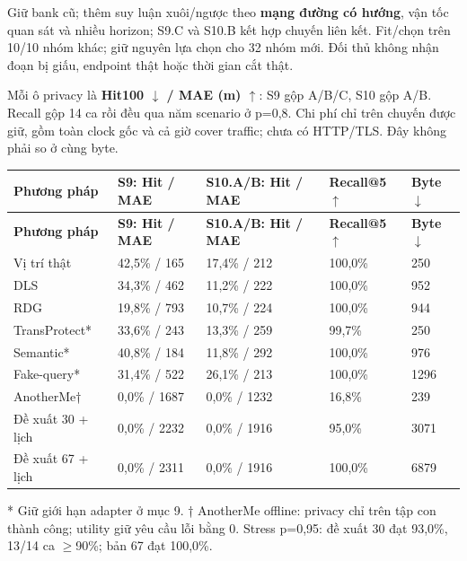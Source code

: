 \documentclass[10pt,a4paper]{article}
\begin{document}
Giữ bank cũ; thêm suy luận xuôi/ngược theo \textbf{mạng đường có hướng}, vận tốc quan sát và nhiều horizon; S9.C và S10.B kết hợp chuyến liên kết. Fit/chọn trên 10/10 nhóm khác; giữ nguyên lựa chọn cho 32 nhóm mới. Đối thủ không nhận đoạn bị giấu, endpoint thật hoặc thời gian cắt thật.

Mỗi ô privacy là \textbf{Hit100 $\downarrow$ / MAE (m) $\uparrow$}: S9 gộp A/B/C, S10 gộp A/B. Recall gộp 14 ca rồi đều qua năm scenario ở p=0,8. Chi phí chỉ trên chuyến được giữ, gồm toàn clock gốc và cả giờ cover traffic; chưa có HTTP/TLS. Đây không phải so ở cùng byte.

\begingroup\small
\begin{longtable}{@{}P{3.900cm}P{3.329cm}P{3.329cm}P{2.663cm}P{2.854cm}@{}}
\toprule
\textbf{Phương pháp} & \textbf{S9: Hit / MAE} & \textbf{S10.A/B: Hit / MAE} & \textbf{Recall@5 $\uparrow$} & \textbf{Byte $\downarrow$}\\\midrule
\endfirsthead
\toprule
\textbf{Phương pháp} & \textbf{S9: Hit / MAE} & \textbf{S10.A/B: Hit / MAE} & \textbf{Recall@5 $\uparrow$} & \textbf{Byte $\downarrow$}\\\midrule
\endhead
\bottomrule\endfoot
Vị trí thật & 42,5\% / 165 & 17,4\% / 212 & 100,0\% & 250\\
\addlinespace[3pt]
DLS & 34,3\% / 462 & 11,2\% / 222 & 100,0\% & 952\\
\addlinespace[3pt]
RDG & 19,8\% / 793 & 10,7\% / 224 & 100,0\% & 944\\
\addlinespace[3pt]
TransProtect* & 33,6\% / 243 & 13,3\% / 259 & 99,7\% & 250\\
\addlinespace[3pt]
Semantic* & 40,8\% / 184 & 11,8\% / 292 & 100,0\% & 976\\
\addlinespace[3pt]
Fake-query* & 31,4\% / 522 & 26,1\% / 213 & 100,0\% & 1296\\
\addlinespace[3pt]
AnotherMe† & 0,0\% / 1687 & 0,0\% / 1232 & 16,8\% & 239\\
\addlinespace[3pt]
Đề xuất 30 + lịch & 0,0\% / 2232 & 0,0\% / 1916 & 95,0\% & 3071\\
\addlinespace[3pt]
Đề xuất 67 + lịch & 0,0\% / 2311 & 0,0\% / 1916 & 100,0\% & 6879\\
\end{longtable}
\endgroup
* Giữ giới hạn adapter ở mục 9. † AnotherMe offline: privacy chỉ trên tập con thành công; utility giữ yêu cầu lỗi bằng 0. Stress p=0,95: đề xuất 30 đạt 93,0\%, 13/14 ca $\ge$90\%; bản 67 đạt 100,0\%.
\end{document}
